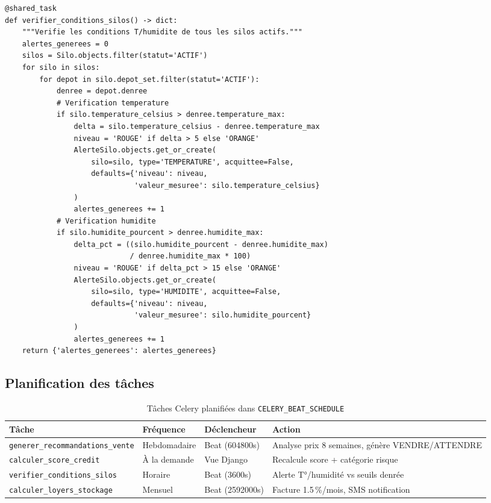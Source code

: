 \documentclass[12pt,a4paper,twoside]{report}
\begin{document}
\begin{lstlisting}[style=pythonstyle, caption={Tâche \texttt{verifier\_conditions\_silos()} --- exécutée chaque heure}]
@shared_task
def verifier_conditions_silos() -> dict:
    """Verifie les conditions T/humidite de tous les silos actifs."""
    alertes_generees = 0
    silos = Silo.objects.filter(statut='ACTIF')
    for silo in silos:
        for depot in silo.depot_set.filter(statut='ACTIF'):
            denree = depot.denree
            # Verification temperature
            if silo.temperature_celsius > denree.temperature_max:
                delta = silo.temperature_celsius - denree.temperature_max
                niveau = 'ROUGE' if delta > 5 else 'ORANGE'
                AlerteSilo.objects.get_or_create(
                    silo=silo, type='TEMPERATURE', acquittee=False,
                    defaults={'niveau': niveau,
                              'valeur_mesuree': silo.temperature_celsius}
                )
                alertes_generees += 1
            # Verification humidite
            if silo.humidite_pourcent > denree.humidite_max:
                delta_pct = ((silo.humidite_pourcent - denree.humidite_max)
                             / denree.humidite_max * 100)
                niveau = 'ROUGE' if delta_pct > 15 else 'ORANGE'
                AlerteSilo.objects.get_or_create(
                    silo=silo, type='HUMIDITE', acquittee=False,
                    defaults={'niveau': niveau,
                              'valeur_mesuree': silo.humidite_pourcent}
                )
                alertes_generees += 1
    return {'alertes_generees': alertes_generees}
\end{lstlisting}

\subsection{Planification des tâches}

\begin{table}[H]
\centering
\caption{Tâches Celery planifiées dans \texttt{CELERY\_BEAT\_SCHEDULE}}
\label{tab:celery_tasks}
\begin{tabular}{L{4.5cm}L{2.5cm}L{3cm}L{3.5cm}}
\toprule
\textbf{Tâche} & \textbf{Fréquence} & \textbf{Déclencheur} & \textbf{Action} \\
\midrule
\texttt{generer\_recommandations\_vente} & Hebdomadaire & Beat (604800s) & Analyse prix 8 semaines, génère VENDRE/ATTENDRE \\
\texttt{calculer\_score\_credit}         & À la demande & Vue Django     & Recalcule score + catégorie risque \\
\texttt{verifier\_conditions\_silos}     & Horaire      & Beat (3600s)   & Alerte T°/humidité vs seuils denrée \\
\texttt{calculer\_loyers\_stockage}      & Mensuel      & Beat (2592000s)& Facture 1.5\,\%/mois, SMS notification \\
\bottomrule
\end{tabular}
\end{table}
\end{document}
